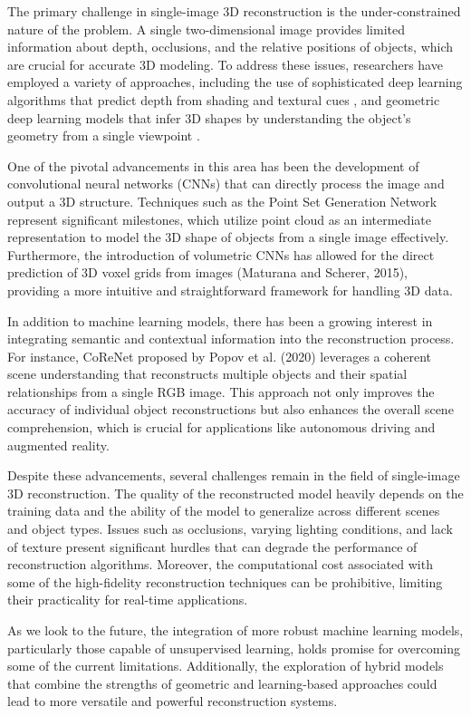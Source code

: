 \documentclass[conference]{IEEEtran}
\begin{document}
The primary challenge in single-image 3D reconstruction is the under-constrained nature of the problem. A single two-dimensional image provides limited information about depth, occlusions, and the relative positions of objects, which are crucial for accurate 3D modeling. To address these issues, researchers have employed a variety of approaches, including the use of sophisticated deep learning algorithms that predict depth from shading and textural cues \cite{eigen2014}, and geometric deep learning models that infer 3D shapes by understanding the object's geometry from a single viewpoint \cite{bronstein2017}.

One of the pivotal advancements in this area has been the development of convolutional neural networks (CNNs) that can directly process the image and output a 3D structure. Techniques such as the Point Set Generation Network \cite{fan2016} represent significant milestones, which utilize point cloud as an intermediate representation to model the 3D shape of objects from a single image effectively. Furthermore, the introduction of volumetric CNNs has allowed for the direct prediction of 3D voxel grids from images (Maturana and Scherer, 2015), providing a more intuitive and straightforward framework for handling 3D data.

In addition to machine learning models, there has been a growing interest in integrating semantic and contextual information into the reconstruction process. For instance, CoReNet proposed by Popov et al. (2020) leverages a coherent scene understanding that reconstructs multiple objects and their spatial relationships from a single RGB image. This approach not only improves the accuracy of individual object reconstructions but also enhances the overall scene comprehension, which is crucial for applications like autonomous driving and augmented reality.

Despite these advancements, several challenges remain in the field of single-image 3D reconstruction. The quality of the reconstructed model heavily depends on the training data and the ability of the model to generalize across different scenes and object types. Issues such as occlusions, varying lighting conditions, and lack of texture present significant hurdles that can degrade the performance of reconstruction algorithms. Moreover, the computational cost associated with some of the high-fidelity reconstruction techniques can be prohibitive, limiting their practicality for real-time applications.

As we look to the future, the integration of more robust machine learning models, particularly those capable of unsupervised learning, holds promise for overcoming some of the current limitations. Additionally, the exploration of hybrid models that combine the strengths of geometric and learning-based approaches could lead to more versatile and powerful reconstruction systems.
\end{document}
